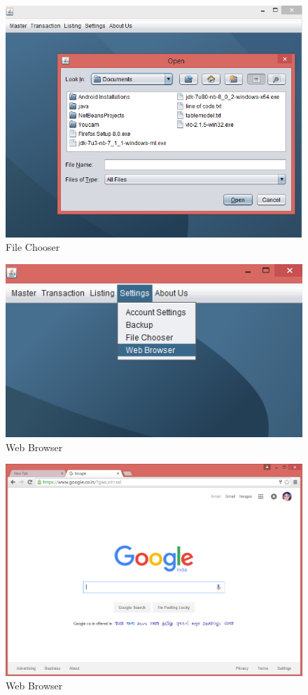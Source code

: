 \begin{figure}[ht]
\begin{center}
\includegraphics[scale=0.5]{images/image52.png}
\end{center}
\caption{File Chooser}
\label{File Chooser}
\end{figure}

\begin{figure}[ht]
\begin{center}
\includegraphics[scale=0.5]{images/image53.png}
\end{center}
\caption{Web Browser}
\label{Web Browser}
\end{figure}

\begin{figure}[ht]
\begin{center}
\includegraphics[scale=0.5]{images/image54.png}
\end{center}
\caption{Web Browser}
\label{Web Browser}
\end{figure}

